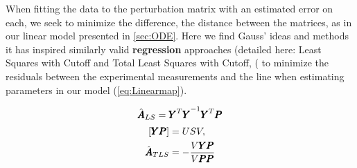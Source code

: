 When fitting the data to the perturbation matrix with an estimated error on each, we seek to minimize the difference, the distance between the matrices, as in our linear model presented in \cref{sec:ODE}. Here we find Gauss' ideas and methods it has inspired similarly valid \textbf{regression} approaches (detailed here: Least Squares with Cutoff and Total Least Squares with Cutoff, (%
to minimize the residuals between the experimental measurements and the line when estimating parameters in our model (\cref{eq:Linearmap}). %

  \begin{equation}
       \hat{{\pmb{A}}}_{LS}={{{\pmb{Y}}^T{\pmb{Y}}}^{-1} {\pmb{Y}}^T{\pmb{P}}}
 \label{eq:LSCO}
 \end{equation}
\begin{equation}
  \begin{aligned}
    \lbrack {\pmb{Y}} {\pmb{P}}\rbrack &= U S V , \\
    \hat{{\pmb{A}}}_{TLS} &= -\frac{V{\pmb{Y}}{\pmb{P}}}{V{\pmb{P}}{\pmb{P}}}
 \label{eq:TLSCO}
  \end{aligned}
 \end{equation}


